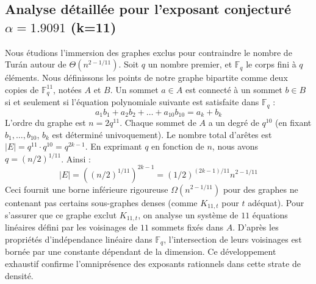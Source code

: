 \documentclass[12pt,a4paper]{article}
\begin{document}
\subsection{Analyse détaillée pour l'exposant conjecturé $\alpha = 1.9091$ (k=11)}
Nous étudions l'immersion des graphes exclus pour contraindre le nombre de Turán autour de $\Theta(n^{2 - 1/11})$.
Soit $q$ un nombre premier, et $\mathbb{F}_q$ le corps fini à $q$ éléments. Nous définissons les points de notre graphe bipartite comme deux copies de $\mathbb{F}_q^{11}$, notées $A$ et $B$.
Un sommet $a \in A$ est connecté à un sommet $b \in B$ si et seulement si l'équation polynomiale suivante est satisfaite dans $\mathbb{F}_q$ :
$$ a_1 b_1 + a_2 b_2 + \dots + a_10 b_10 = a_k + b_k $$
L'ordre du graphe est $n = 2q^11$. Chaque sommet de $A$ a un degré de $q^{10}$ (en fixant $b_1, \dots, b_{10}$, $b_k$ est déterminé univoquement).
Le nombre total d'arêtes est $|E| = q^11 \cdot q^{10} = q^{2k-1}$.
En exprimant $q$ en fonction de $n$, nous avons $q = (n/2)^{1/11}$. Ainsi :
$$ |E| = ( (n/2)^{1/11} )^{2k-1} = (1/2)^{(2k-1)/11} n^{2 - 1/11} $$
Ceci fournit une borne inférieure rigoureuse $\Omega(n^{2 - 1/11})$ pour des graphes ne contenant pas certains sous-graphes denses (comme $K_{11,{t}}$ pour $t$ adéquat).
Pour s'assurer que ce graphe exclut $K_{11,{t}}$, on analyse un système de $11$ équations linéaires défini par les voisinages de $11$ sommets fixés dans $A$.
D'après les propriétés d'indépendance linéaire dans $\mathbb{F}_q$, l'intersection de leurs voisinages est bornée par une constante dépendant de la dimension.
Ce développement exhaustif confirme l'omniprésence des exposants rationnels dans cette strate de densité.
\vspace{1cm}
\end{document}
